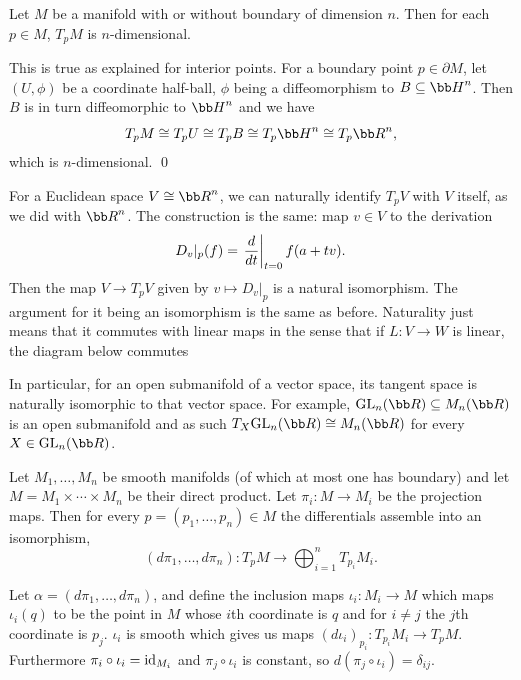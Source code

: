 \eproof

\bprop

    Let $M$ be a manifold with or without boundary of dimension $n$.
    Then for each $p\in M$, $T_pM$ is $n$-dimensional.

\eprop

\bproof

    This is true as explained for interior points.
    For a boundary point $p\in\partial M$, let $(U,\phi)$ be a coordinate half-ball, $\phi$ being a diffeomorphism to $B\subseteq\bH^n$.
    Then $B$ is in turn diffeomorphic to $\bH^n$ and we have
    $$ T_pM \cong T_pU \cong T_pB \cong T_p\bH^n \cong T_p\bR^n , $$
    which is $n$-dimensional.
    \qed

\eproof

For a Euclidean space $V\cong\bR^n$, we can naturally identify $T_pV$ with $V$ itself, as we did with $\bR^n$.
The construction is the same: map $v\in V$ to the derivation
$$ D_v|_p(f) = \left.{{d}\over{dt}}\right|_{t=0}f(a+tv) . $$
Then the map $V\to T_pV$ given by $v\mapsto D_v|_p$ is a natural isomorphism.
The argument for it being an isomorphism is the same as before.
Naturality just means that it commutes with linear maps in the sense that if $L\colon V\to W$ is linear, the diagram below commutes

\centerline{}

In particular, for an open submanifold of a vector space, its tangent space is naturally isomorphic to that vector space.
For example, $\gl_n(\bR)\subseteq M_n(\bR)$ is an open submanifold and as such $T_X\gl_n(\bR)\cong M_n(\bR)$ for every $X\in\gl_n(\bR)$.

\bprop

    Let $M_1,\dots,M_n$ be smooth manifolds (of which at most one has boundary) and let $M=M_1\times\cdots\times M_n$ be their direct product.
    Let $\pi_i\colon M\to M_i$ be the projection maps.
    Then for every $p=(p_1,\dots,p_n)\in M$ the differentials assemble into an isomorphism,
    $$ (d\pi_1,\dots,d\pi_n)\colon T_pM \to \bigoplus_{i=1}^n T_{p_i}M_i . $$

\eprop

\bproof

    Let $\alpha=(d\pi_1,\dots,d\pi_n)$, and define the inclusion maps $\iota_i\colon M_i\to M$ which maps $\iota_i(q)$ to be the point in $M$
    whose $i$th coordinate is $q$ and for $i\neq j$ the $j$th coordinate is $p_j$.
    $\iota_i$ is smooth which gives us maps $(d\iota_i)_{p_i}\colon T_{p_i}M_i\to T_pM$.
    Furthermore $\pi_i\circ\iota_i={\rm id}_{M_i}$ and $\pi_j\circ\iota_i$ is constant, so $d(\pi_j\circ\iota_i)=\delta_{ij}$.

